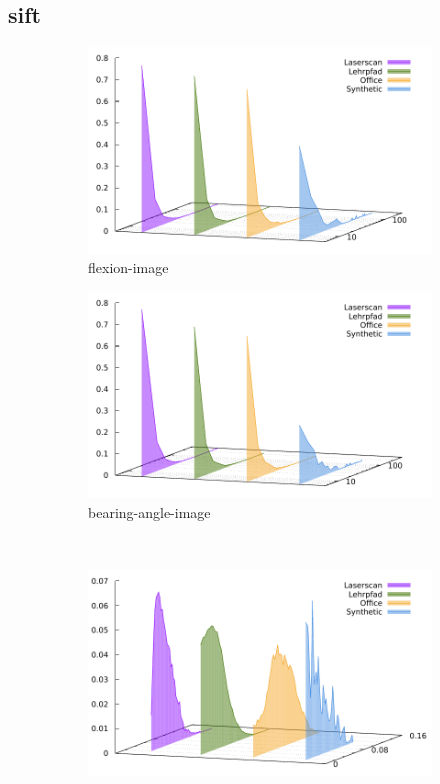 \subsection{\acrshort{sift}}\label{sec:sift_stats}
\begin{figure}[H]
\begin{subfigure}[t]{0.45\linewidth}
    \includegraphics[width=\linewidth]{chapter06/results/SIFT/flexion/size.pdf}%
    \caption{\gls{flexion-image}}
\end{subfigure}\quad
\begin{subfigure}[t]{0.45\linewidth}
    \includegraphics[width=\linewidth]{chapter06/results/SIFT/bearing/size.pdf}
    \caption{\gls{bearing-angle-image}}
\end{subfigure}\\
\begin{subfigure}[t]{0.45\linewidth}
    \includegraphics[width=\linewidth]{chapter06/results/SIFT/flexion/response.pdf}%

\end{subfigure}
\end{figure}
